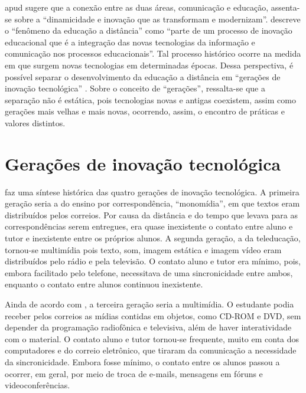 \documentclass{textolivre}
\begin{document}
\textcite{formiga2009} apud \cite[p. 99]{oliveira2016} sugere que a conexão entre as duas áreas, comunicação e educação, assenta-se sobre a “dinamicidade e inovação que as transformam e modernizam”. \textcite[p. 123]{belloni2002} descreve o “fenômeno da educação a distância” como “parte de um processo de inovação educacional que é a integração das novas tecnologias da informação e comunicação nos processos educacionais”. Tal processo histórico ocorre na medida em que surgem novas tecnologias em determinadas épocas. Dessa perspectiva, é possível separar o desenvolvimento da educação a distância em “gerações de inovação tecnológica” \cite[p. 138]{gomes2003}. Sobre o conceito de “gerações”, ressalta-se que a separação não é estática, pois tecnologias novas e antigas coexistem, assim como gerações mais velhas e mais novas, ocorrendo, assim, o encontro de práticas e valores distintos.

\section{Gerações de inovação tecnológica}\label{sec-geracoes}

\textcite{gomes2003} faz uma síntese histórica das quatro gerações de inovação tecnológica. A primeira geração seria a do ensino por correspondência, “monomídia”, em que textos eram distribuídos pelos correios. Por causa da distância e do tempo que levava para as correspondências serem entregues, era quase inexistente o contato entre aluno e tutor e inexistente entre os próprios alunos. A segunda geração, a da teleducação, tornou-se multimídia pois texto, som, imagem estática e imagem vídeo eram distribuídos pelo rádio e pela televisão. O contato aluno e tutor era mínimo, pois, embora facilitado pelo telefone, necessitava de uma sincronicidade entre ambos, enquanto o contato entre alunos continuou inexistente. 

Ainda de acordo com \textcite{gomes2003}, a terceira geração seria a multimídia. O estudante podia receber pelos correios as mídias contidas em objetos, como CD-ROM e DVD, sem depender da programação radiofônica e televisiva, além de haver interatividade com o material. O contato aluno e tutor tornou-se frequente, muito em conta dos computadores e do correio eletrônico, que tiraram da comunicação a necessidade da sincronicidade. Embora fosse mínimo, o contato entre os alunos passou a ocorrer, em geral, por meio de troca de e-mails, mensagens em fóruns e videoconferências. 
\end{document}
